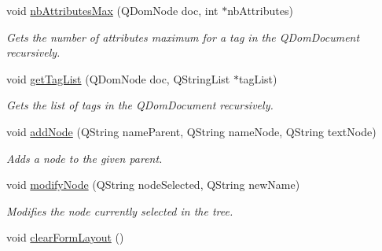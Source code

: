 \begin{DoxyCompactItemize}
void \hyperlink{classMainWindow_ab1cd5d659de665dd74bb81eb8c8dbf5d}{nb\-Attributes\-Max} (Q\-Dom\-Node doc, int $\ast$nb\-Attributes)
\begin{DoxyCompactList}\small\item\em Gets the number of attributes maximum for a tag in the Q\-Dom\-Document recursively. \end{DoxyCompactList}\item 
void \hyperlink{classMainWindow_af34f3d4d5da8e2b7daf444e221809e0c}{get\-Tag\-List} (Q\-Dom\-Node doc, Q\-String\-List $\ast$tag\-List)
\begin{DoxyCompactList}\small\item\em Gets the list of tags in the Q\-Dom\-Document recursively. \end{DoxyCompactList}\item 
void \hyperlink{classMainWindow_a2988f42c5d8edc521b9368a61bd25677}{add\-Node} (Q\-String name\-Parent, Q\-String name\-Node, Q\-String text\-Node)
\begin{DoxyCompactList}\small\item\em Adds a node to the given parent. \end{DoxyCompactList}\item 
void \hyperlink{classMainWindow_a885f74bf6dbd209942899d3b2c50b5cd}{modify\-Node} (Q\-String node\-Selected, Q\-String new\-Name)
\begin{DoxyCompactList}\small\item\em Modifies the node currently selected in the tree. \end{DoxyCompactList}\item 
\hypertarget{classMainWindow_a832b124c66bb3cd641b7c6cea8b72a10}{void \hyperlink{classMainWindow_a832b124c66bb3cd641b7c6cea8b72a10}{clear\-Form\-Layout} ()}\label{classMainWindow_a832b124c66bb3cd641b7c6cea8b72a10}


\end{DoxyCompactItemize}
